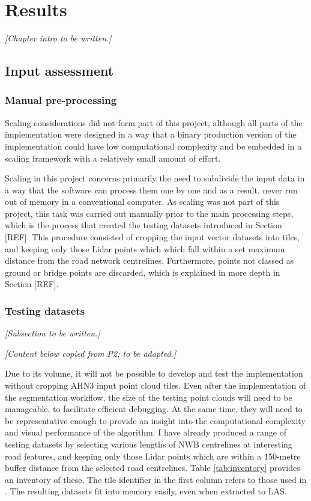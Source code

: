 
\chapter{Results}
\label{chap:r}

\textit{[Chapter intro to be written.]}

\section{Input assessment}
\label{sec:input}

\subsection{Manual pre-processing}
\label{sub:manualpreprocessing}

Scaling considerations did not form part of this project, although all parts of the implementation were designed in a way that a binary production version of the implementation could have low computational complexity and be embedded in a scaling framework with a relatively small amount of effort.

Scaling in this project concerns primarily the need to subdivide the input data in a way that the software can process them one by one and as a result, never run out of memory in a conventional computer. As scaling was not part of this project, this task was carried out manually prior to the main processing steps, which is the process that created the testing datasets introduced in Section [REF]. This procedure consisted of cropping the input vector datasets into tiles, and keeping only those Lidar points which which fall within a set maximum distance from the road network centrelines. Furthermore, points not classed as ground or bridge points are discarded, which is explained in more depth in Section [REF].

\subsection{Testing datasets}
\label{sub:testingdata}

\textit{[Subsection to be written.]}

\textit{[Content below copied from P2; to be adapted.]}

Due to its volume, it will not be possible to develop and test the implementation without cropping AHN3 input point cloud tiles. Even after the implementation of the segmentation workflow, the size of the testing point clouds will need to be manageable, to facilitate efficient debugging. At the same time, they will need to be representative enough to provide an insight into the computational complexity and visual performance of the algorithm. I have already produced a range of testing datasets by selecting various lengths of NWB centrelines at interesting road features, and keeping only those Lidar points which are within a 150-metre buffer distance from the selected road centrelines. Table \ref{tab:inventory} provides an inventory of these. The tile identifier in the first column refers to those used in \cite{ahn3_download}. The resulting datasets fit into memory easily, even when extracted to LAS.

